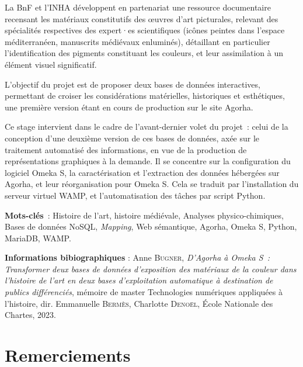\documentclass[a4paper,12pt, twoside]{book}
\begin{document}
La BnF et l’INHA développent en partenariat une ressource documentaire recensant les matériaux constitutifs des œuvres d’art picturales, relevant des spécialités respectives des expert·es scientifiques (icônes peintes dans l’espace méditerranéen, manuscrits médiévaux enluminés), détaillant en particulier l’identification des pigments constituant les couleurs, et leur assimilation à un élément visuel significatif.

\medskip

L’objectif du projet est de proposer deux bases de données interactives, permettant de croiser les considérations matérielles, historiques et esthétiques, une première version étant en cours de production sur le site Agorha.

\medskip

Ce stage intervient dans le cadre de l’avant-dernier volet du projet~: celui de la conception d’une deuxième version de ces bases de données, axée sur le traitement automatisé des informations, en vue de la production de représentations graphiques à la demande. Il se concentre sur la configuration du logiciel Omeka S, la caractérisation et l’extraction des données hébergées sur Agorha, et leur réorganisation pour Omeka S. Cela se traduit par l'installation du serveur virtuel WAMP, et l'automatisation des tâches par script Python.

\vfill

\textbf{Mots-clés}~: Histoire de l'art, histoire médiévale, Analyses physico-chimiques, Bases de données NoSQL, \textit{Mapping}, Web sémantique, Agorha, Omeka S, Python, MariaDB, WAMP.

\bigskip

\textbf{Informations bibiographiques} : Anne \textsc{Bugner}, \textit{D’Agorha à Omeka S~: Transformer deux bases de données d’exposition des matériaux de la couleur dans l’histoire de l’art en deux bases d’exploitation automatique à destination de publics différenciés}, mémoire de master \og Technologies numériques appliquées à l'histoire\fg , dir. Emmanuelle \textsc{Bermès}, Charlotte \textsc{Denoël}, École Nationale des Chartes, 2023.

\clearemptydoublepage
\chapter*{Remerciements}
\end{document}

